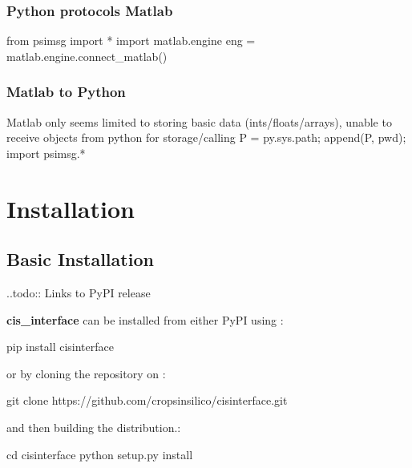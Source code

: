 \documentclass[letterpaper,10pt,english]{sphinxmanual}
\begin{document}
\subsection{Python protocols Matlab}
\label{\detokenize{includeme:python-protocols-matlab}}
from psimsg import * import matlab.engine eng =
matlab.engine.connect\_matlab()


\subsection{Matlab to Python}
\label{\detokenize{includeme:matlab-to-python}}
Matlab only seems limited to storing basic data (ints/floats/arrays),
unable to receive objects from python for storage/calling P =
py.sys.path; append(P, pwd); import psimsg.*


\chapter{Installation}
\label{\detokenize{install:installation}}\label{\detokenize{install::doc}}

\section{Basic Installation}
\label{\detokenize{install:basic-installation}}
..todo:: Links to PyPI release

{\color{red}\bfseries{}\textbar{}cis\_interface\textbar{}} can be installed from either PyPI using :

\begin{sphinxVerbatim}[commandchars=\\\{\}]
\PYGZdl{} pip install cis\PYGZus{}interface
\end{sphinxVerbatim}

or by cloning the  repository on :

\begin{sphinxVerbatim}[commandchars=\\\{\}]
\PYGZdl{} git clone https://github.com/cropsinsilico/cis\PYGZus{}interface.git
\end{sphinxVerbatim}

and then building the distribution.:

\begin{sphinxVerbatim}[commandchars=\\\{\}]
\PYGZdl{} cd cis\PYGZus{}interface
\PYGZdl{} python setup.py install
\end{sphinxVerbatim}
\end{document}
